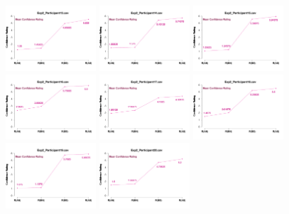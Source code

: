 \begin{figure}[th]
\includegraphics[width=0.30\textwidth]{Figures/MirrorRating_Exp2_P13} \includegraphics[width=0.30\textwidth]{Figures/MirrorRating_Exp2_P14} \includegraphics[width=0.30\textwidth]{Figures/MirrorRating_Exp2_P15}
\includegraphics[width=0.30\textwidth]{Figures/MirrorRating_Exp2_P16} \includegraphics[width=0.30\textwidth]{Figures/MirrorRating_Exp2_P17} \includegraphics[width=0.30\textwidth]{Figures/MirrorRating_Exp2_P18}
\includegraphics[width=0.30\textwidth]{Figures/MirrorRating_Exp2_P19} \includegraphics[width=0.30\textwidth]{Figures/MirrorRating_Exp2_P20} 

\end{figure}
